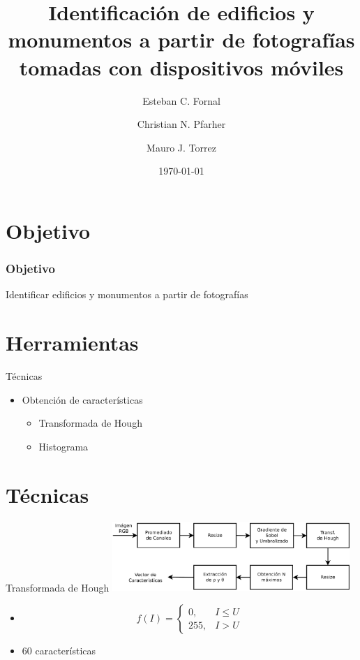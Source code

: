 \documentclass[spanish]{beamer}
\title{Identificación de edificios y monumentos a partir de fotografías tomadas 
con dispositivos móviles}
\author{Esteban C. Fornal \and Christian N. Pfarher \and Mauro J. Torrez}
\date{\today}
\begin{document}
%
\frame{\titlepage}

\section[Outline]{Objetivo}

\begin{frame}{}
\frametitle{Objetivo}
Identificar edificios y monumentos a partir de fotografías
\end{frame}

\section[Outline]{Herramientas}

\begin{frame}{Técnicas}
\begin{itemize}
\item Obtención de características
\begin{itemize}
\item<1-> Transformada de Hough
\item<2-> Histograma
\end{itemize}
\end{itemize}
\end{frame}

\section[Outline]{Técnicas}

\begin{frame}{Transformada de Hough}
  \includegraphics[width=9cm]{../diagramas/procesohough}

  \begin{itemize}
  \item[]
    \begin{equation*}
      \label{umbral}
      f(I)=
      \begin{cases}
      0, & I\leq U\\
      255, & I > U
      \end{cases}
      \end{equation*}
  \item 60 características
  \end{itemize}
\end{frame}
\end{document}
